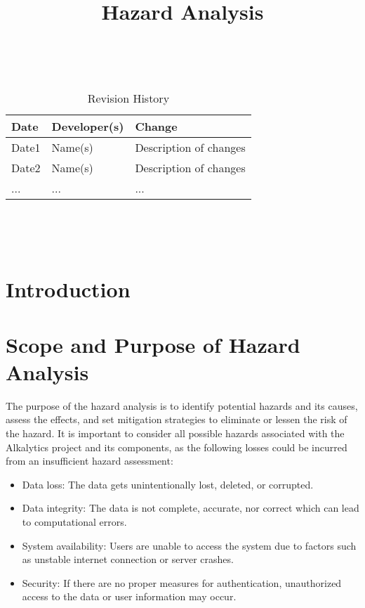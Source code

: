 \documentclass{article}
\title{Hazard Analysis\\\progname}
\author{\authname}
\date{}
\begin{document}
\maketitle
\thispagestyle{empty}

~\newpage


\begin{table}[hp]
\caption{Revision History} \label{TblRevisionHistory}
\begin{tabularx}{\textwidth}{llX}
\toprule
\textbf{Date} & \textbf{Developer(s)} & \textbf{Change}\\
\midrule
Date1 & Name(s) & Description of changes\\
Date2 & Name(s) & Description of changes\\
... & ... & ...\\
\bottomrule
\end{tabularx}
\end{table}

~\newpage

\tableofcontents

~\newpage



\section{Introduction}


\section{Scope and Purpose of Hazard Analysis}

The purpose of the hazard analysis is to identify potential hazards and its causes, assess the effects, and set mitigation strategies to eliminate or lessen the risk of the hazard. It is important to consider all possible hazards associated with the Alkalytics project and its components, as the following losses could be incurred from an insufficient hazard assessment:
\begin{itemize}
    \item Data loss: The data gets unintentionally lost, deleted, or corrupted.
    \item Data integrity: The data is not complete, accurate, nor correct which can lead to computational errors.
    \item System availability: Users are unable to access the system due to factors such as unstable internet connection or server crashes.
    \item Security: If there are no proper measures for authentication, unauthorized access to the data or user information may occur.
\end{itemize}
\end{document}

